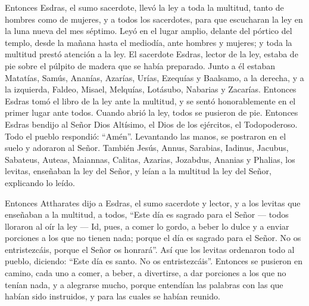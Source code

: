  Entonces Esdras, el sumo sacerdote, llevó la ley a toda
la multitud, tanto de hombres como de mujeres, y a todos los sacerdotes,
para que escucharan la ley en la luna nueva del mes séptimo.
 Leyó en el lugar amplio, delante del pórtico del templo,
desde la mañana hasta el mediodía, ante hombres y mujeres; y toda la
multitud prestó atención a la ley.  El sacerdote Esdras,
lector de la ley, estaba de pie sobre el púlpito de madera que se había
preparado.  Junto a él estaban Matatías, Samús, Ananías,
Azarías, Urías, Ezequías y Baalsamo, a la derecha,  y a
la izquierda, Faldeo, Misael, Melquías, Lotásubo, Nabarias y Zacarías.
 Entonces Esdras tomó el libro de la ley ante la
multitud, y se sentó honorablemente en el primer lugar ante todos.
 Cuando abrió la ley, todos se pusieron de pie. Entonces
Esdras bendijo al Señor Dios Altísimo, el Dios de los ejércitos, el
Todopoderoso.  Todo el pueblo respondió: ``Amén''.
Levantando las manos, se postraron en el suelo y adoraron al Señor.
 También Jesús, Annus, Sarabias, Iadinus, Jacubus,
Sabateus, Auteas, Maiannas, Calitas, Azarias, Jozabdus, Ananias y
Phalias, los levitas, enseñaban la ley del Señor, y leían a la multitud
la ley del Señor, explicando lo leído.

 Entonces Attharates dijo a Esdras, el sumo sacerdote y
lector, y a los levitas que enseñaban a la multitud, a todos,
 ``Este día es sagrado para el Señor --- todos lloraron
al oír la ley ---  Id, pues, a comer lo gordo, a beber lo
dulce y a enviar porciones a los que no tienen nada; 
porque el día es sagrado para el Señor. No os entristezcáis, porque el
Señor os honrará''.  Así que los levitas ordenaron todo
al pueblo, diciendo: ``Este día es santo. No os entristezcáis''.
 Entonces se pusieron en camino, cada uno a comer, a
beber, a divertirse, a dar porciones a los que no tenían nada, y a
alegrarse mucho,  porque entendían las palabras con las
que habían sido instruidos, y para las cuales se habían reunido.

